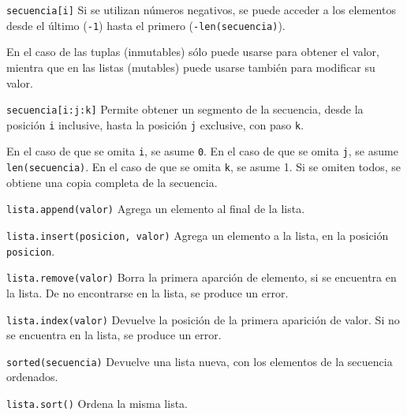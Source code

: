 \begin{referencia_python}
\begin{sintaxis}{\lstinline!secuencia[i]!}
Si se utilizan números negativos, se puede acceder a los
elementos desde el último (\lstinline!-1!) hasta el primero
(\lstinline!-len(secuencia)!).

En el caso de las tuplas (inmutables) sólo puede usarse para obtener el
valor, mientra que en las listas (mutables) puede usarse también para
modificar su valor.
\end{sintaxis}

\begin{sintaxis}{\lstinline!secuencia[i:j:k]!}
Permite obtener un segmento de la secuencia, desde la posición \lstinline!i!
inclusive, hasta la posición \lstinline!j! exclusive, con paso
\lstinline!k!.

En el caso de que se omita \lstinline!i!, se asume \lstinline!0!.  En el
caso de que se omita \lstinline!j!, se asume \lstinline!len(secuencia)!.
En el caso de que se omita \lstinline!k!, se asume 1. Si
se omiten todos, se obtiene una copia completa de la secuencia.
\end{sintaxis}

\begin{sintaxis}{\lstinline!lista.append(valor)!}
Agrega un elemento al final de la lista.
\end{sintaxis}

\begin{sintaxis}{\lstinline!lista.insert(posicion, valor)!}
Agrega un elemento a la lista, en la posición \lstinline!posicion!.
\end{sintaxis}

\begin{sintaxis}{\lstinline!lista.remove(valor)!}
Borra la primera aparción de elemento, si se encuentra en la lista.  De no
encontrarse en la lista, se produce un error.
\end{sintaxis}

\begin{sintaxis}{\lstinline!lista.index(valor)!}
Devuelve la posición de la primera aparición de valor.  Si no se encuentra
en la lista, se produce un error.
\end{sintaxis}

\begin{sintaxis}{\lstinline!sorted(secuencia)!}
Devuelve una lista nueva, con los elementos de la secuencia ordenados.
\end{sintaxis}

\begin{sintaxis}{\lstinline!lista.sort()!}
Ordena la misma lista.
\end{sintaxis}


\end{referencia_python}
